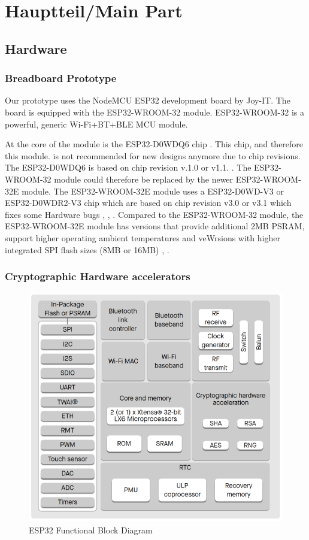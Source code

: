 \chapter{Hauptteil/Main Part}

\section{Hardware}
\subsection{Breadboard Prototype}
Our prototype uses the NodeMCU ESP32 development board by Joy-IT. The board is equipped with the ESP32-WROOM-32 module. ESP32-WROOM-32 is a powerful, generic Wi-Fi+BT+BLE MCU module. 

At the core of the module is the ESP32-D0WDQ6 chip \cite[6]{esp32-module}. This chip, and therefore this module. is not recommended for new designs anymore due to chip revisions. The ESP32-D0WDQ6 is based on chip revision v.1.0 or v1.1. \cite[11]{esp32-datasheet}. The ESP32-WROOM-32 module could therefore be replaced by the newer ESP32-WROOM-32E module. The ESP32-WROOM-32E module uses a ESP32-D0WD-V3 or ESP32-D0WDR2-V3 chip which are based on chip revision v3.0 or v3.1 which fixes some Hardware bugs \cite[1]{esp32-module-new}, \cite[11]{esp32-datasheet}, \cite[3-4]{esp32-errata}. Compared to the ESP32-WROOM-32 module, the ESP32-WROOM-32E module has versions that provide additional 2MB PSRAM, support higher operating ambient temperatures and veWrsions with higher integrated SPI flash sizes (8MB or 16MB) \cite[2]{esp32-module-new}, \cite[6-7]{esp32-module}.

\subsection{Cryptographic Hardware accelerators}
\begin{figure}
	\centering
	\includegraphics[scale=.5]{abbildungen/functional-block-diagram}
	\caption{ESP32 Functional Block Diagram}
	\label{Fig:esp32-crypto}
\end{figure}



